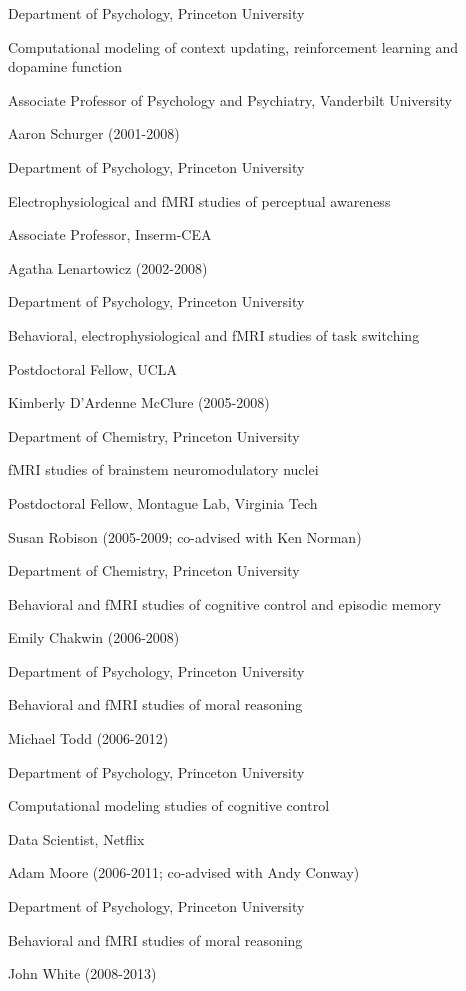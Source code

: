 \documentclass[10 pt]{article}
\begin{document}
Department of Psychology, Princeton University

Computational modeling of context updating, reinforcement learning and dopamine function

Associate Professor of Psychology and Psychiatry, Vanderbilt University
    \medskip

Aaron Schurger (2001-2008)

Department of Psychology, Princeton University

Electrophysiological and fMRI studies of perceptual awareness

Associate Professor, Inserm-CEA
    \medskip

Agatha Lenartowicz (2002-2008)

Department of Psychology, Princeton University

Behavioral, electrophysiological and fMRI studies of task switching

Postdoctoral Fellow, UCLA
    \medskip

Kimberly D’Ardenne McClure (2005-2008)

Department of Chemistry, Princeton University

fMRI studies of brainstem neuromodulatory nuclei

Postdoctoral Fellow, Montague Lab, Virginia Tech
    \medskip

Susan Robison (2005-2009; co-advised with Ken Norman)

Department of Chemistry, Princeton University

Behavioral and fMRI studies of cognitive control and episodic memory
    \medskip

Emily Chakwin (2006-2008)

Department of Psychology, Princeton University

Behavioral and fMRI studies of moral reasoning
    \medskip

Michael Todd (2006-2012)

Department of Psychology, Princeton University

Computational modeling studies of cognitive control

Data Scientist, Netflix
    \medskip

Adam Moore (2006-2011; co-advised with Andy Conway)

Department of Psychology, Princeton University

Behavioral and fMRI studies of moral reasoning
    \medskip

John White (2008-2013)
\end{document}
